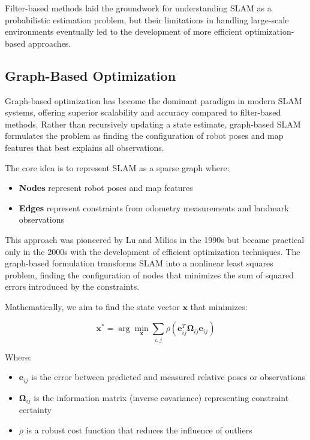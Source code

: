 \documentclass[12pt]{article}
\begin{document}
    Filter-based methods laid the groundwork for understanding SLAM as a probabilistic estimation problem, but their limitations in handling large-scale environments eventually 
    led to the development of more efficient optimization-based approaches.
    
    \subsection{Graph-Based Optimization}
    
    Graph-based optimization has become the dominant paradigm in modern SLAM systems, offering superior scalability and accuracy compared to filter-based methods. 
    Rather than recursively updating a state estimate, graph-based SLAM formulates the problem as finding the configuration of robot poses and map features that best explains all observations.
    
    The core idea is to represent SLAM as a sparse graph where:
    \begin{itemize}
        \item \textbf{Nodes} represent robot poses and map features
        \item \textbf{Edges} represent constraints from odometry measurements and landmark observations
    \end{itemize}
    
    This approach was pioneered by Lu and Milios in the 1990s but became practical only in the 2000s with the development of efficient optimization techniques. 
    The graph-based formulation transforms SLAM into a nonlinear least squares problem, finding the configuration of nodes that minimizes the sum of squared errors introduced by the constraints.
    
    Mathematically, we aim to find the state vector $\mathbf{x}$ that minimizes:
    
    $$\mathbf{x}^* = \arg\min_{\mathbf{x}} \sum_{i,j} \rho(\mathbf{e}_{ij}^T \mathbf{\Omega}_{ij} \mathbf{e}_{ij})$$
    
    Where:
    \begin{itemize}
        \item $\mathbf{e}_{ij}$ is the error between predicted and measured relative poses or observations
        \item $\mathbf{\Omega}_{ij}$ is the information matrix (inverse covariance) representing constraint certainty
        \item $\rho$ is a robust cost function that reduces the influence of outliers
    \end{itemize}
    
\end{document}
